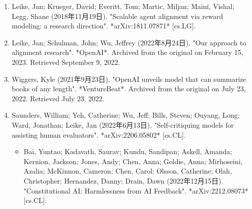 \begin{enumerate}
\item Leike, Jan; Krueger, David; Everitt, Tom; Martic, Miljan; Maini, Vishal; Legg, Shane (2018年11月19日). "Scalable agent alignment via reward modeling: a research direction". *arXiv:1811.07871* [cs.LG].\item Leike, Jan; Schulman, John; Wu, Jeffrey (2022年8月24日). "Our approach to alignment research". *OpenAI*. Archived from the original on February 15, 2023. Retrieved September 9, 2022.
\item Wiggers, Kyle (2021年9月23日). "OpenAI unveils model that can summarize books of any length". *VentureBeat*. Archived from the original on July 23, 2022. Retrieved July 23, 2022.
\item Saunders, William; Yeh, Catherine; Wu, Jeff; Bills, Steven; Ouyang, Long; Ward, Jonathan; Leike, Jan (2022年6月13日). "Self-critiquing models for assisting human evaluators". *arXiv:2206.05802* [cs.CL].
\begin{itemize}
\item Bai, Yuntao; Kadavath, Saurav; Kundu, Sandipan; Askell, Amanda; Kernion, Jackson; Jones, Andy; Chen, Anna; Goldie, Anna; Mirhoseini, Azalia; McKinnon, Cameron; Chen, Carol; Olsson, Catherine; Olah, Christopher; Hernandez, Danny; Drain, Dawn (2022年12月15日). "Constitutional AI: Harmlessness from AI Feedback". *arXiv:2212.08073* [cs.CL].
\end{itemize}
\end{enumerate}